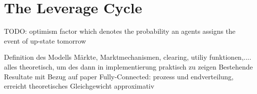\documentclass[../Bachelorarbeit.tex]{subfiles}
\begin{document}
\chapter{The Leverage Cycle}
\label{ch:leverageCycle}

TODO: optimism factor which denotes the probability an agents assigns the event of up-state tomorrow

Definition des Modells
		Märkte, Marktmechanismen, clearing, utiliy funktionen,....
		alles theoretisch, um des dann in implementierung praktisch zu zeigen
	Bestehende Resultate mit Bezug auf paper
		Fully-Connected: prozess und endverteilung, erreicht theoretisches Gleichgewicht approximativ
\end{document}
